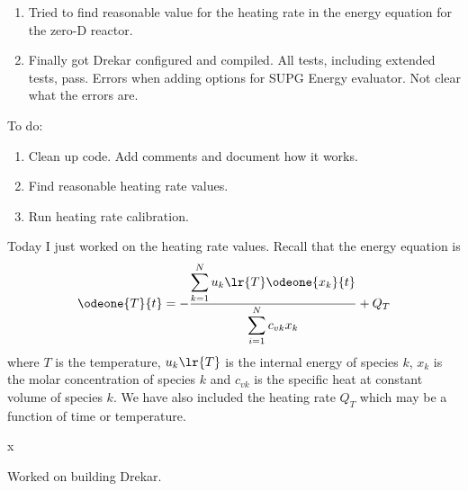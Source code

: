 
\begin{enumerate}
  \item Tried to find reasonable value for the heating rate in the energy equation for the zero-D reactor.
  \item Finally got Drekar configured and compiled.  All tests, including extended tests, pass.  Errors when adding options for SUPG Energy evaluator.  Not clear what the errors are.
\end{enumerate}

To do:
\begin{enumerate}
  \item Clean up code.  Add comments and document how it works.
  \item Find reasonable heating rate values.
  \item Run heating rate calibration.
\end{enumerate}
Today I just worked on the heating rate values.
Recall that the energy equation is
\begin{align}
  \odeone{T}{t} = -\dfrac{\displaystyle\sum_{k=1}^{N}{u_{k}\lr{T}\odeone{x_{k}}{t}}}{\displaystyle\sum_{i=1}^{N}{c_{vk}x_{k}}} + Q_{T}
\end{align}
where $T$ is the temperature, $u_{k}\lr{T}$ is the internal energy of species $k$, $x_{k}$ is the molar concentration of species $k$ and $c_{vk}$ is the specific heat at constant volume of species $k$.  We have also included the heating rate $Q_{T}$ which may be a function of time or temperature.

\begin{tcolorbox}[colback=blue!5, colframe=blue!40!black, title=Configuring Drekar with Extended System Tests]
  x
\end{tcolorbox}

Worked on building Drekar.




